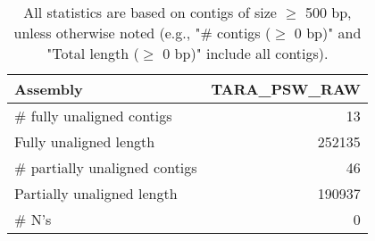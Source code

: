 \documentclass[12pt,a4paper]{article}
\begin{document}
\begin{table}[ht]
\begin{center}
\caption{All statistics are based on contigs of size $\geq$ 500 bp, unless otherwise noted (e.g., "\# contigs ($\geq$ 0 bp)" and "Total length ($\geq$ 0 bp)" include all contigs).}
\begin{tabular}{|l*{1}{|r}|}
\hline
Assembly & TARA\_PSW\_RAW \\ \hline
\# fully unaligned contigs & 13 \\ \hline
Fully unaligned length & 252135 \\ \hline
\# partially unaligned contigs & 46 \\ \hline
Partially unaligned length & 190937 \\ \hline
\# N's & 0 \\ \hline
\end{tabular}
\end{center}
\end{table}
\end{document}
